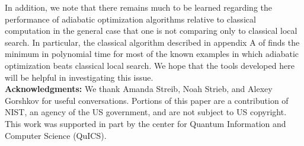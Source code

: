 In addition, we note that there remains much to be learned regarding
the performance of adiabatic optimization algorithms relative to
classical computation in the general case that one is not comparing
only to classical local search. In particular, the classical algorithm
described in appendix A of \cite{childswalk} finds the minimum in
polynomial time for most of the known examples in which adiabatic
optimization beats classical local search. We hope that the tools
developed here will be helpful in investigating this issue.\\ 

\noindent
\textbf{Acknowledgments: }We thank Amanda Streib, Noah Strieb, and
Alexey Gorshkov for useful conversations. Portions of this paper are a
contribution of NIST, an agency of the US government, and are not
subject to US copyright. This work was supported in part by the center
for Quantum Information and Computer Science (QuICS).

